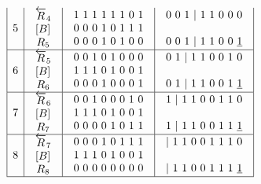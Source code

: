 $$\begin{array}{c}
\begin{array}{|c|c|c|c|}
5 & \begin{array}{c}\overleftarrow{R}_4 \\  \left[B\right]_{\textup{}} \\ R_5\end{array} & \begin{array}{c}1\ 1\ 1\ 1\ 1\ 1\ 0\ 1 \\ 0\ 0\ 0\ 1\ 0\ 1\ 1\ 1 \\ 0\ 0\ 0\ 1\ 0\ 1\ 0\ 0\end{array} & \begin{array}{c}0\ 0\ 1\ |\ 1\ 1\ 0\ 0\ 0 \\  \\ 0\ 0\ 1\ |\ 1\ 1\ 0\ 0\ \underline{1}\end{array} \\ \hline 
6 & \begin{array}{c}\overleftarrow{R}_5 \\  \left[B\right]_{\textup{}} \\ R_6\end{array} & \begin{array}{c}0\ 0\ 1\ 0\ 1\ 0\ 0\ 0 \\ 1\ 1\ 1\ 0\ 1\ 0\ 0\ 1 \\ 0\ 0\ 0\ 1\ 0\ 0\ 0\ 1\end{array} & \begin{array}{c}0\ 1\ |\ 1\ 1\ 0\ 0\ 1\ 0 \\  \\ 0\ 1\ |\ 1\ 1\ 0\ 0\ 1\ \underline{1}\end{array} \\ \hline 
7 & \begin{array}{c}\overleftarrow{R}_6 \\  \left[B\right]_{\textup{}} \\ R_7\end{array} & \begin{array}{c}0\ 0\ 1\ 0\ 0\ 0\ 1\ 0 \\ 1\ 1\ 1\ 0\ 1\ 0\ 0\ 1 \\ 0\ 0\ 0\ 0\ 1\ 0\ 1\ 1\end{array} & \begin{array}{c}1\ |\ 1\ 1\ 0\ 0\ 1\ 1\ 0 \\  \\ 1\ |\ 1\ 1\ 0\ 0\ 1\ 1\ \underline{1}\end{array} \\ \hline 
8 & \begin{array}{c}\overleftarrow{R}_7 \\  \left[B\right]_{\textup{}} \\ R_8\end{array} & \begin{array}{c}0\ 0\ 0\ 1\ 0\ 1\ 1\ 1 \\ 1\ 1\ 1\ 0\ 1\ 0\ 0\ 1 \\ 0\ 0\ 0\ 0\ 0\ 0\ 0\ 0\end{array} & \begin{array}{c}|\ 1\ 1\ 0\ 0\ 1\ 1\ 1\ 0 \\  \\ |\ 1\ 1\ 0\ 0\ 1\ 1\ 1\ \underline{1}\end{array} \\ \hline 

\end{array}
\end{array}$$

